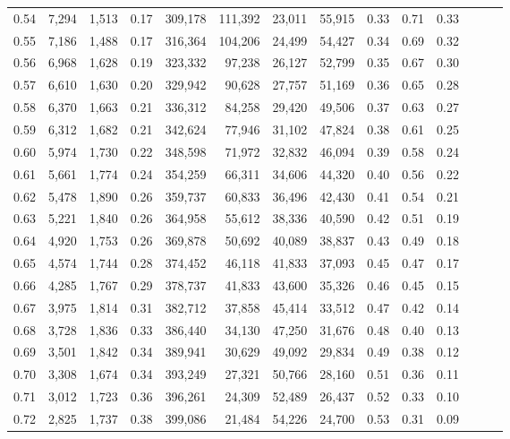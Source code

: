 \begin{tabular}{rrrrrrrrrrrrrr}
0.54 &  7,294 &  1,513 &  0.17 &  309,178 &  111,392 &  23,011 &  55,915 &  0.33 &  0.71 &      0.33 \\
0.55 &  7,186 &  1,488 &  0.17 &  316,364 &  104,206 &  24,499 &  54,427 &  0.34 &  0.69 &      0.32 \\
0.56 &  6,968 &  1,628 &  0.19 &  323,332 &   97,238 &  26,127 &  52,799 &  0.35 &  0.67 &      0.30 \\
0.57 &  6,610 &  1,630 &  0.20 &  329,942 &   90,628 &  27,757 &  51,169 &  0.36 &  0.65 &      0.28 \\
0.58 &  6,370 &  1,663 &  0.21 &  336,312 &   84,258 &  29,420 &  49,506 &  0.37 &  0.63 &      0.27 \\
0.59 &  6,312 &  1,682 &  0.21 &  342,624 &   77,946 &  31,102 &  47,824 &  0.38 &  0.61 &      0.25 \\
0.60 &  5,974 &  1,730 &  0.22 &  348,598 &   71,972 &  32,832 &  46,094 &  0.39 &  0.58 &      0.24 \\
0.61 &  5,661 &  1,774 &  0.24 &  354,259 &   66,311 &  34,606 &  44,320 &  0.40 &  0.56 &      0.22 \\
0.62 &  5,478 &  1,890 &  0.26 &  359,737 &   60,833 &  36,496 &  42,430 &  0.41 &  0.54 &      0.21 \\
0.63 &  5,221 &  1,840 &  0.26 &  364,958 &   55,612 &  38,336 &  40,590 &  0.42 &  0.51 &      0.19 \\
0.64 &  4,920 &  1,753 &  0.26 &  369,878 &   50,692 &  40,089 &  38,837 &  0.43 &  0.49 &      0.18 \\
0.65 &  4,574 &  1,744 &  0.28 &  374,452 &   46,118 &  41,833 &  37,093 &  0.45 &  0.47 &      0.17 \\
0.66 &  4,285 &  1,767 &  0.29 &  378,737 &   41,833 &  43,600 &  35,326 &  0.46 &  0.45 &      0.15 \\
0.67 &  3,975 &  1,814 &  0.31 &  382,712 &   37,858 &  45,414 &  33,512 &  0.47 &  0.42 &      0.14 \\
0.68 &  3,728 &  1,836 &  0.33 &  386,440 &   34,130 &  47,250 &  31,676 &  0.48 &  0.40 &      0.13 \\
0.69 &  3,501 &  1,842 &  0.34 &  389,941 &   30,629 &  49,092 &  29,834 &  0.49 &  0.38 &      0.12 \\
0.70 &  3,308 &  1,674 &  0.34 &  393,249 &   27,321 &  50,766 &  28,160 &  0.51 &  0.36 &      0.11 \\
0.71 &  3,012 &  1,723 &  0.36 &  396,261 &   24,309 &  52,489 &  26,437 &  0.52 &  0.33 &      0.10 \\
0.72 &  2,825 &  1,737 &  0.38 &  399,086 &   21,484 &  54,226 &  24,700 &  0.53 &  0.31 &      0.09 \\

\end{tabular}
